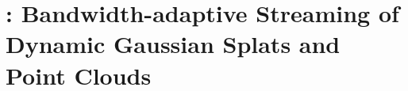 \chapter{\gsnfs: Bandwidth-adaptive Streaming of Dynamic Gaussian Splats and Point Clouds}
\label{ch:gsnfs}

\graphicspath{{chapter_gsnfs/}}

